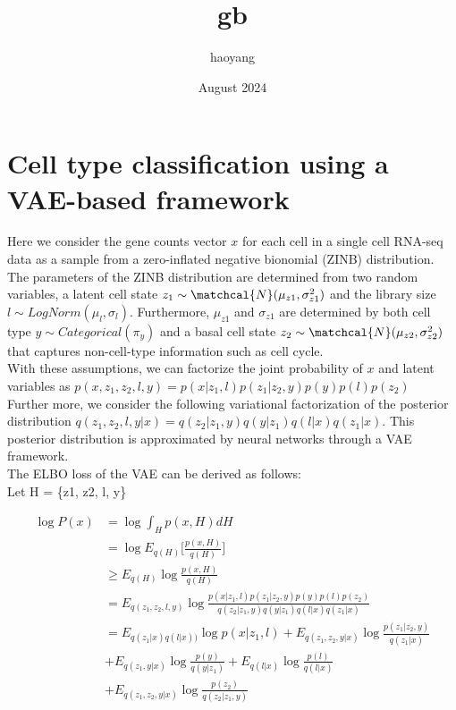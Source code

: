 \documentclass{article}
\title{gb}
\author{haoyang }
\date{August 2024}
\begin{document}
\section{Cell type classification using a VAE-based framework}

Here we consider the gene counts vector $x$ for each cell in a single cell RNA-seq data as a sample from a zero-inflated negative bionomial (ZINB) distribution. The parameters of the ZINB distribution are determined from two random variables, a latent cell state $z_1 \sim \matchcal{N}(\mu_{z1}, \sigma_{z1}^2)$ and the library size $l \sim LogNorm(\mu_l, \sigma_l)$. Furthermore, $\mu_{z1}$ and $\sigma_{z1}$ are determined by both cell type $y \sim Categorical(\pi_y)$ and a basal cell state $z_2 \sim \matchcal{N}(\mu_{z2}, \sigma_{z2}^2)$ that captures non-cell-type information such as cell cycle. \\

With these assumptions, we can factorize the joint probability of $x$ and latent variables as $ p(x, z_1,z_2,l,y) = p(x|z_1, l)p(z_1|z_2,y)p(y)p(l)p(z_2)$ \\

Further more, we consider the following variational factorization of the posterior distribution $q(z_1,z_2,l,y|x) = q(z_2|z_1,y)q(y|z_1)q(l|x)q(z_1|x)$. This posterior distribution is approximated by neural networks through a VAE framework. \\


The ELBO loss of the VAE can be derived as follows: \\


Let H = \{z1, z2, l, y\}


\begin{align}
\log P(x) &= \log \int_{H} p(x, H) dH  \\
&= \log E_{q(H)}\big[\frac{p(x, H)}{q(H)} \big] \\
&\geq E_{q(H)}\log \frac{p(x, H)}{q(H)} \\
&= E_{q(z_1, z_2, l, y)}\log \frac{p(x|z_1, l)p(z_1|z_2,y)p(y)p(l)p(z_2)}{q(z_2|z_1,y)q(y|z_1)q(l|x)q(z_1|x)} \\
&= E_{q(z_1|x)q(l|x))} \log p(x|z_1, l) + E_{q(z_1, z_2, y|x)} \log \frac{p(z_1|z_2, y)}{q(z_1|x)} \\
&+ E_{q(z_1, y|x)} \log \frac{p(y)}{q(y|z_1)} + E_{q(l|x)} \log \frac{p(l)}{q(l|x)}  \\
&+ E_{q(z_1,z_2, y |x)} \log \frac{p(z_2)}{q(z_2|z_1, y)}  
\end{align}
\end{document}

